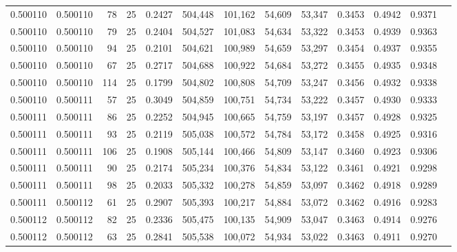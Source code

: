 \begin{tabular}{rrrrrrrrrrrrr}
0.500110 & 0.500110 &    78 &  25 &                                     0.2427 & 504,448 & 101,162 &  54,609 &  53,347 & 0.3453 & 0.4942 & 0.9371 \\
0.500110 & 0.500110 &    79 &  25 &                                     0.2404 & 504,527 & 101,083 &  54,634 &  53,322 & 0.3453 & 0.4939 & 0.9363 \\
0.500110 & 0.500110 &    94 &  25 &                                     0.2101 & 504,621 & 100,989 &  54,659 &  53,297 & 0.3454 & 0.4937 & 0.9355 \\
0.500110 & 0.500110 &    67 &  25 &                                     0.2717 & 504,688 & 100,922 &  54,684 &  53,272 & 0.3455 & 0.4935 & 0.9348 \\
0.500110 & 0.500110 &   114 &  25 &                                     0.1799 & 504,802 & 100,808 &  54,709 &  53,247 & 0.3456 & 0.4932 & 0.9338 \\
0.500110 & 0.500111 &    57 &  25 &                                     0.3049 & 504,859 & 100,751 &  54,734 &  53,222 & 0.3457 & 0.4930 & 0.9333 \\
0.500111 & 0.500111 &    86 &  25 &                                     0.2252 & 504,945 & 100,665 &  54,759 &  53,197 & 0.3457 & 0.4928 & 0.9325 \\
0.500111 & 0.500111 &    93 &  25 &                                     0.2119 & 505,038 & 100,572 &  54,784 &  53,172 & 0.3458 & 0.4925 & 0.9316 \\
0.500111 & 0.500111 &   106 &  25 &                                     0.1908 & 505,144 & 100,466 &  54,809 &  53,147 & 0.3460 & 0.4923 & 0.9306 \\
0.500111 & 0.500111 &    90 &  25 &                                     0.2174 & 505,234 & 100,376 &  54,834 &  53,122 & 0.3461 & 0.4921 & 0.9298 \\
0.500111 & 0.500111 &    98 &  25 &                                     0.2033 & 505,332 & 100,278 &  54,859 &  53,097 & 0.3462 & 0.4918 & 0.9289 \\
0.500111 & 0.500112 &    61 &  25 &                                     0.2907 & 505,393 & 100,217 &  54,884 &  53,072 & 0.3462 & 0.4916 & 0.9283 \\
0.500112 & 0.500112 &    82 &  25 &                                     0.2336 & 505,475 & 100,135 &  54,909 &  53,047 & 0.3463 & 0.4914 & 0.9276 \\
0.500112 & 0.500112 &    63 &  25 &                                     0.2841 & 505,538 & 100,072 &  54,934 &  53,022 & 0.3463 & 0.4911 & 0.9270 \\

\end{tabular}
